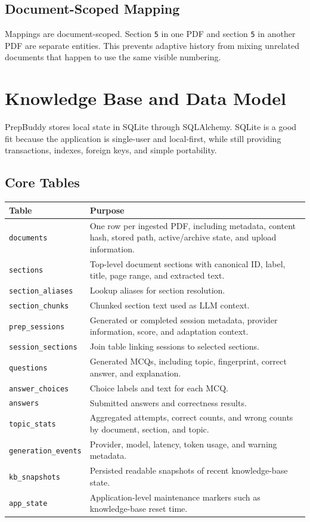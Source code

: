 \documentclass[11pt]{article}
\begin{document}
\subsection{Document-Scoped Mapping}

Mappings are document-scoped. Section \texttt{5} in one PDF and section \texttt{5} in another PDF are separate entities. This prevents adaptive history from mixing unrelated documents that happen to use the same visible numbering.

\section{Knowledge Base and Data Model}

PrepBuddy stores local state in SQLite through SQLAlchemy. SQLite is a good fit because the application is single-user and local-first, while still providing transactions, indexes, foreign keys, and simple portability.

\subsection{Core Tables}

\begin{longtable}{p{}p{}}
\toprule
\textbf{Table} & \textbf{Purpose} \\
\midrule
\texttt{documents} & One row per ingested PDF, including metadata, content hash, stored path, active/archive state, and upload information. \\
\texttt{sections} & Top-level document sections with canonical ID, label, title, page range, and extracted text. \\
\texttt{section\_aliases} & Lookup aliases for section resolution. \\
\texttt{section\_chunks} & Chunked section text used as LLM context. \\
\texttt{prep\_sessions} & Generated or completed session metadata, provider information, score, and adaptation context. \\
\texttt{session\_sections} & Join table linking sessions to selected sections. \\
\texttt{questions} & Generated MCQs, including topic, fingerprint, correct answer, and explanation. \\
\texttt{answer\_choices} & Choice labels and text for each MCQ. \\
\texttt{answers} & Submitted answers and correctness results. \\
\texttt{topic\_stats} & Aggregated attempts, correct counts, and wrong counts by document, section, and topic. \\
\texttt{generation\_events} & Provider, model, latency, token usage, and warning metadata. \\
\texttt{kb\_snapshots} & Persisted readable snapshots of recent knowledge-base state. \\
\texttt{app\_state} & Application-level maintenance markers such as knowledge-base reset time. \\
\bottomrule
\end{longtable}
\end{document}
